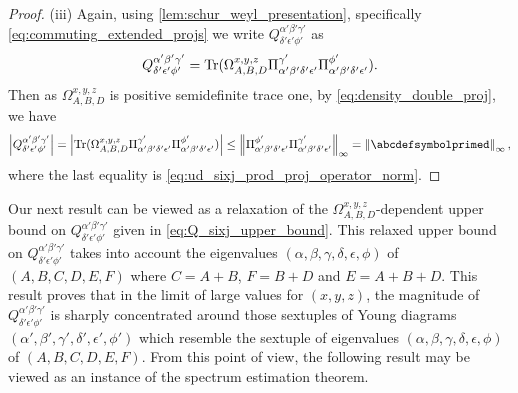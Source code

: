 \documentclass[notitlepage, 10pt]{article}
\begin{document}
\begin{proof}
    (iii) Again, using \cref{lem:schur_weyl_presentation}, specifically \cref{eq:commuting_extended_projs} we write $Q^{\alpha'\beta'\gamma'}_{\delta'\epsilon'\phi'}$ as
    \begin{equation}
        Q^{\alpha'\beta'\gamma'}_{\delta'\epsilon'\phi'}
        =
        \operatorname{Tr}(\Omega_{A,B,D}^{x,y,z} \Pi^{\gamma'}_{\alpha'\beta'\delta'\epsilon'}\Pi^{\phi'}_{\alpha'\beta'\delta'\epsilon'}).
    \end{equation}
    Then as $\Omega_{A,B,D}^{x,y,z}$ is positive semidefinite trace one, by \cref{eq:density_double_proj}, we have
    \begin{equation}
        \abs{Q^{\alpha'\beta'\gamma'}_{\delta'\epsilon'\phi'}} = \abs{\Tr(\Omega_{A,B,D}^{x,y,z}\Pi^{\gamma'}_{\alpha'\beta'\delta'\epsilon'}\Pi^{\phi'}_{\alpha'\beta'\delta'\epsilon'})} \leq 
        \norm{\Pi^{\phi'}_{\alpha'\beta'\delta'\epsilon'}\Pi^{\gamma'}_{\alpha'\beta'\delta'\epsilon'}}_{\infty} = \norm{\abcdefsymbolprimed}_{\infty},
    \end{equation}
    where the last equality is \cref{eq:ud_sixj_prod_proj_operator_norm}.
\end{proof}


Our next result can be viewed as a relaxation of the $\Omega_{A,B,D}^{x,y,z}$-dependent upper bound on $Q^{\alpha'\beta'\gamma'}_{\delta'\epsilon'\phi'}$ given in \cref{eq:Q_sixj_upper_bound}.
This relaxed upper bound on $Q^{\alpha'\beta'\gamma'}_{\delta'\epsilon'\phi'}$ takes into account the eigenvalues $(\alpha,\beta,\gamma,\delta,\epsilon,\phi)$ of $(A, B, C, D, E, F)$ where $C=A+B$, $F=B+D$ and $E=A+B+D$.
This result proves that in the limit of large values for $(x,y,z)$, the magnitude of $Q^{\alpha'\beta'\gamma'}_{\delta'\epsilon'\phi'}$ is sharply concentrated around those sextuples of Young diagrams $(\alpha',\beta',\gamma',\delta',\epsilon',\phi')$ which resemble the sextuple of eigenvalues $(\alpha,\beta,\gamma,\delta,\epsilon,\phi)$ of $(A,B,C,D,E,F)$.
From this point of view, the following result may be viewed as an instance of the spectrum estimation theorem.
\end{document}
